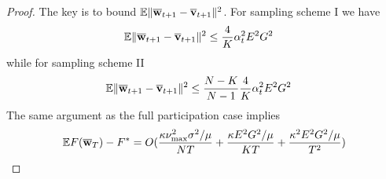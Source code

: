\begin{proof}
	The key is to bound $\mathbb{E}\|{\overline{\mathbf{w}}}_{t+1}-{\overline{\mathbf{v}}}_{t+1}\|^{2}$.
	For sampling scheme I we have 
	\begin{align*}
	\mathbb{E}\|{\overline{\mathbf{w}}}_{t+1}-{\overline{\mathbf{v}}}_{t+1}\|^{2} & \leq\frac{4}{K}\alpha_{t}^{2}E^{2}G^{2}
	\end{align*}
	while for sampling scheme II 
	\begin{align*}
	\mathbb{E}\|{\overline{\mathbf{w}}}_{t+1}-{\overline{\mathbf{v}}}_{t+1}\|^{2} & \leq\frac{N-K}{N-1}\frac{4}{K}\alpha_{t}^{2}E^{2}G^{2}
	\end{align*}
	The same argument as the full participation case implies 
	\begin{align*}
	\mathbb{E}F({\overline{\mathbf{w}}}_{T})-F^{\ast}=O(\frac{\kappa\nu_{\max}^{2}\sigma^{2}/\mu}{NT}+\frac{\kappa E^{2}G^{2}/\mu}{KT}+\frac{\kappa^{2}E^{2}G^{2}/\mu}{T^{2}})
	\end{align*}
	
	\begin{comment}
	\begin{proof}
	With partial participation, $2E\sum_{\tau=1}^{E-1}\alpha_{t-\tau}^{2}\sum_{k=1}^{N}p_{k}\left(\|\nabla F_{k}(\ov{w}_{t-\tau},\mathbf{\xi}_{t-\tau}^{k})\|^{2}+l^{2}\|w_{t-\tau}^{k}-\ov{w}_{t-\tau}\|^{2}\right)$
	\begin{align*}
	\mathbb{E}\|\ov{w}_{t+1}-\vw^{\ast}\|^{2} & \leq\mathbb{E}(1-\mu\alpha_{t})\|\ov{w}_{t}-\vw^{\ast}\|^{2}+5E^{2}L\alpha_{t}^{3}G^{2}+\alpha_{t}^{2}\frac{1}{N}\nu_{max}^{2}\sigma^{2}+\frac{1}{K}\sum_{k}p^{k}\|\vw_{t}^{k}-\ov{w}_{t}\|^{2}\\
	& \leq\mathbb{E}(1-\mu\alpha_{t})\|\ov{w}_{t}-\vw^{\ast}\|^{2}+5E^{2}L\alpha_{t}^{3}G^{2}+\alpha_{t}^{2}\frac{1}{N}\nu_{max}^{2}\sigma^{2}+\frac{4}{K}\alpha_{t}^{2}E^{2}G^{2}\\
	& \leq\mathbb{E}(1-\mu\alpha_{t})(1-\mu\alpha_{t-1})\cdots(1-\mu\alpha_{t-E})\|\ov{w}_{t-E}-\vw^{\ast}\|^{2}=O(\frac{1}{t-E}\sigma^{2}+E^{2}LG^{2}\frac{1}{(t-E)^{2}}+\frac{E^{2}G^{2}}{K}\frac{1}{(t-E)^{3/2}})\\
	& +(\alpha_{t}^{3}+(1-\mu\alpha_{t-1})\alpha_{t-1}^{3}+(1-\mu\alpha_{t-1})(1-\mu\alpha_{t-2})\alpha_{t-2}^{3}+\cdots+(1-\mu\alpha_{t-1})\cdots(1-\mu\alpha_{t-E})\alpha_{t-E}^{3}E^{2}LG^{2}\\
	& +(\alpha_{t}^{2}+(1-\mu\alpha_{t-1})\alpha_{t-1}^{2}+(1-\mu\alpha_{t-1})(1-\mu\alpha_{t-2})\alpha_{t-2}^{2}+\cdots+(1-\mu\alpha_{t-1})\cdots(1-\mu\alpha_{t-E})\alpha_{t-E}^{2}\sigma^{2}\\
	& +\frac{4}{K}EG^{2}(\alpha_{t}^{2}+\alpha_{t-1}^{2}+\cdots+\alpha_{t-E}^{2})
	\end{align*}
	

\end{comment}
\end{proof}
